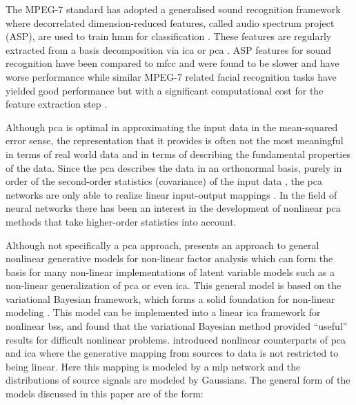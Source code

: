 The MPEG-7 standard \cite{Casey2001} has adopted a generalised sound recognition framework where decorrelated dimension-reduced features, called audio spectrum project (ASP), are used to train \gls{hmm} for classification \cite{Kim2006}. These features are regularly extracted from a basis decomposition via \gls{ica} or \gls{pca} \cite{Casey2001}\cite{Kim2003}\cite{Kim2006}. ASP features for sound recognition have been compared to \gls{mfcc} and were found to be slower and have worse performance \cite{Kim2004} while similar MPEG-7 related facial recognition tasks have yielded good performance but with a significant computational cost for the feature extraction step \cite{Zaeri2006}.

Although \gls{pca} is optimal in approximating the input data in the mean-squared error sense, the representation that it provides is often not the most meaningful in terms of real world data and in terms of describing the fundamental properties of the data. Since the \gls{pca} describes the data in an orthonormal basis, purely in order of the second-order statistics (covariance) of the input data \citep{Oja1995}, the \gls{pca} networks are only able to realize linear input-output mappings \citep{Karhunen1995}. In the field of neural networks there has been an interest in the development of nonlinear \gls{pca} methods that take higher-order statistics into account.

Although not specifically a \gls{pca} approach, \cite{Honkela2005} presents an approach to general nonlinear generative models for non-linear factor analysis which can form the basis for many non-linear implementations of latent variable models such as a non-linear generalization of \gls{pca} or even \gls{ica}. This general model is based on the variational Bayesian framework, which forms a solid foundation for non-linear modeling \citep{Honkela2005}. This model can be implemented into a linear \gls{ica} framework for nonlinear \gls{bss}, and \cite{Valpola2003} found that the variational Bayesian method provided ``useful'' results for difficult nonlinear problems. \citep{Lappalainen2000} introduced nonlinear counterparts of \gls{pca} and \gls{ica} where the generative mapping from sources to data is not restricted to being linear. Here this mapping is modeled by a \gls{mlp} network and the distributions of source signals are modeled by Gaussians. The general form of the models discussed in this paper are of the form:

